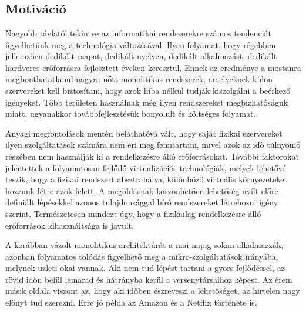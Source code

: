 \chapter{\bevezetes}

\section{Motiváció}

Nagyobb távlatól tekintve az informatikai rendszerekre számos tendenciát figyelhetünk meg a technológia változásával.
Ilyen folyamat, hogy régebben jellemzően dedikált csapat, dedikált nyelven, dedikált alkalmazást, dedikált hardveres erőforrásra fejlesztett éveken keresztül. 
Ennek az eredménye a mostanra megbonthatatlanul nagyra nőtt monolitikus\citep{monoliticAndMicroserviceArchitecture} rendszerek, amelyeknek külön szervereket kell biztosítani, hogy azok hiba nélkül tudják kiszolgálni a beérkező igényeket.
Több területen használnak még ilyen rendszereket megbízhatóságuk miatt, ugyanakkor továbbfejlesztésük bonyolult és költséges folyamat.

Anyagi megfontolások mentén beláthatóvá vált, hogy saját fizikai szervereket ilyen szolgáltatások számára nem éri meg fenntartani, mivel azok az idő túlnyomó részében nem használják ki a rendelkezésre álló erőforrásokat.
További faktorokat jelentettek a folyamatosan fejlődő virtualizációs technológiák, melyek lehetővé teszik, hogy a fizikai rendszert absztrahálva, különböző virtuális környezeteket hozzunk létre azok felett.
A megoldásnak köszönhetően lehetőség nyílt előre definiált lépésekkel azonos tulajdonsággal bíró rendszereket létrehozni igény szerint\citep{infrastuctureAsCode}. 
Természetesen mindezt úgy, hogy a fizikailag rendelkezésre álló erőforrások kihasználtsága is javult.

A korábban vázolt monolitikus architektúrát a mai napig sokan alkalmazzák, azonban folyamatos tolódás figyelhető meg a mikro-szolgáltatások irányába, melynek üzleti okai vannak. 
Aki nem tud lépést tartani a gyors fejlődéssel, az rövid időn belül lemarad és hátrányba kerül a versenytársaihoz képest. 
Az érem másik oldala viszont az, hogy aki időben észreveszi a lehetőséget, az hirtelen nagy előnyt tud szerezni. 
Erre jó példa az Amazon\citep{amazon} és a Netflix\citep{netflix} története is.  

